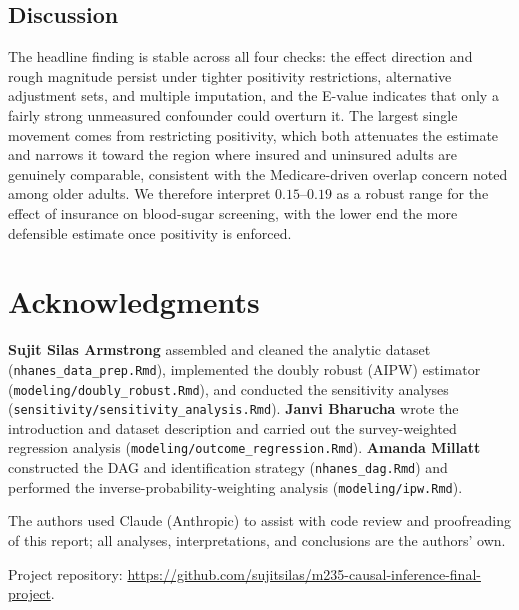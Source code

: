 \documentclass[12pt]{article}
\begin{document}
\subsection{Discussion} \label{subsec:ExtDiscuss}

The headline finding is stable across all four checks: the effect direction and
rough magnitude persist under tighter positivity restrictions, alternative
adjustment sets, and multiple imputation, and the E-value indicates that only a
fairly strong unmeasured confounder could overturn it. The largest single
movement comes from restricting positivity, which both attenuates the estimate
and narrows it toward the region where insured and uninsured adults are
genuinely comparable, consistent with the Medicare-driven overlap concern noted
among older adults. We therefore interpret $0.15$--$0.19$ as a robust range for
the effect of insurance on blood-sugar screening, with the lower end the more
defensible estimate once positivity is enforced.

\newpage

\section{Acknowledgments}

\textbf{Sujit Silas Armstrong} assembled and cleaned the analytic dataset
(\texttt{nhanes\_data\_prep.Rmd}), implemented the doubly robust (AIPW)
estimator (\texttt{modeling/doubly\_robust.Rmd}), and conducted the sensitivity
analyses (\texttt{sensitivity/sensitivity\_analysis.Rmd}). \textbf{Janvi
Bharucha} wrote the introduction and dataset description and carried out the
survey-weighted regression analysis (\texttt{modeling/outcome\_regression.Rmd}).
\textbf{Amanda Millatt} constructed the DAG and identification strategy
(\texttt{nhanes\_dag.Rmd}) and performed the inverse-probability-weighting
analysis (\texttt{modeling/ipw.Rmd}).

The authors used Claude (Anthropic) to assist with code review and proofreading
of this report; all analyses, interpretations, and conclusions are the authors'
own.

Project repository: \url{https://github.com/sujitsilas/m235-causal-inference-final-project}.

\newpage


\end{document}
